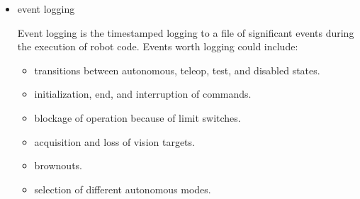 \documentclass[]{article}
\begin{document}
\begin{itemize}[topsep=0pt]

\item event logging

Event logging is the timestamped logging to a file of significant events during the execution of robot code.
Events worth logging could include:
\begin{itemize}[noitemsep,topsep=0pt]
\item transitions between autonomous, teleop, test, and disabled states.
\item initialization, end, and interruption of commands.
\item blockage of operation because of limit switches.
\item acquisition and loss of vision targets.
\item brownouts.
\item selection of different autonomous modes.
\end{itemize}


\end{itemize}
\end{document}
